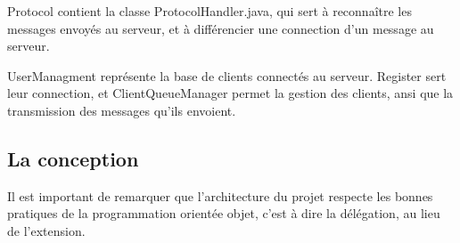 Protocol contient la classe ProtocolHandler.java, qui sert à reconnaître les messages envoyés au serveur, et à différencier une connection d'un message au serveur.

UserManagment représente la base de clients connectés au serveur. Register sert  leur connection, et ClientQueueManager permet la gestion des clients, ansi que la transmission des messages qu'ils envoient.

\subsection{La conception}
Il est important de remarquer que l'architecture du projet respecte les bonnes pratiques de la programmation orientée objet, c'est à dire la délégation, au lieu de l'extension.
